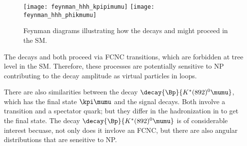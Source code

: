 



\begin{figure}
  \begin{center}
    \texttt{[image: feynman\_hhh\_kpipimumu]}
    \texttt{[image: feynman\_hhh\_phikmumu]}
    \caption[Feynman diagrams for \btokpipimumu and \btophikmumu]{\small
      Feynman diagrams illustrating how the decays \btokpipimumu and \btophikmumu might proceed in
      the SM.
    }
    \label{fig:hhh:feyn}
  \end{center}
\end{figure}


The decays \btokpipimumu and \btophikmumu both proceed via \decay{\bquark}{\squark\mumu} FCNC
transitions, which are forbidden at tree level in the SM.
Therefore, these processes are potentially sensitive to NP contributing
to the decay amplitude as virtual particles in loops.

There are also similarities between the decay $\decay{\Bp}{K^*(892)^0\mumu}$, which has the final
state
$\kpi\mumu$ and the signal decays.
Both involve a \decay{\bquark}{\squark\mumu} transition and a spectator quark; but they differ in
the hadronization in to get the final state.
The decay $\decay{\Bp}{K^*(892)^0\mumu}$ is of considerable interest becuase, not only does it
invlove an FCNC, but there are also angular distributions that are seneitive to NP.

